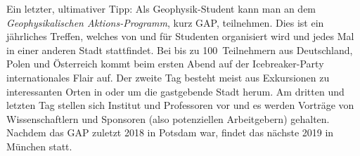 \begin{multicols}{2}
Ein letzter, ultimativer Tipp: Als Geophysik-Student kann man an dem \emph{Geophysikalischen Aktions-Programm}, kurz GAP, teilnehmen.
Dies ist ein jährliches Treffen, welches von und für Studenten organisiert wird und jedes Mal in einer anderen Stadt stattfindet.
Bei bis zu 100~Teilnehmern aus Deutschland, Polen und Österreich kommt beim ersten Abend auf der Icebreaker-Party internationales Flair auf.
Der zweite Tag besteht meist aus Exkursionen zu interessanten Orten in oder um die gastgebende Stadt herum.
Am dritten und letzten Tag stellen sich Institut und Professoren vor und es werden Vorträge von Wissenschaftlern und Sponsoren (also potenziellen Arbeitgebern) gehalten.
Nachdem das GAP zuletzt 2018 in Potsdam war, findet das nächste 2019 in München statt.

\end{multicols}


